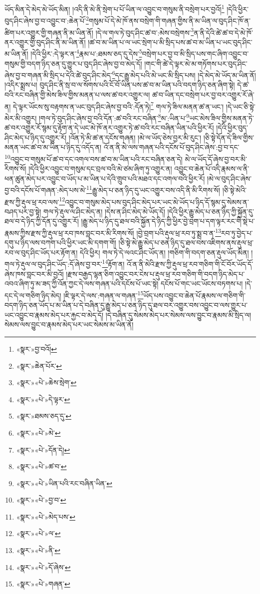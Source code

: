 ཡོད་མིན་དེ་མེད་མེ་ཡོད་མིན། །འདི་ནི་མེ་ནི་སྲེག་པ་པོ་ཡིན་ལ་འབྱུང་བ་གསུམ་ནི་བསྲེག་པར་བྱའོ།\footnote{«སྣར་»བྱ་བའོ།} །དེའི་ཕྱིར་བུད་ཤིང་ཞེས་བྱ་བ་འབྱུང་བ་:ཆེན་པོ་\footnote{«སྣར་»ཆེན་པོར་}གསུམ་པོ་དེ་མེ་ཁོ་ནས་བསྲེག་གི་གཞན་གྱིས་ནི་མ་ཡིན་ལ་བུད་ཤིང་ཁོ་ན་ཚིག་པར་འགྱུར་གྱི་གཞན་ནི་མ་ཡིན་ནོ། །དེ་ལ་གལ་ཏེ་བུད་ཤིང་ཚ་བ་:མེས་བསྲེགས་\footnote{«སྣར་»«པེ་»ཆེས་སྲེག་}ན་ནི་དེའི་ཚེ་ཚ་བ་དེ་མེ་ཁོ་ནར་འགྱུར་གྱི་བུད་ཤིང་ནི་མ་ཡིན་ནོ། །ཚ་བ་མ་ཡིན་པ་ལ་ཡང་སྲེག་པ་མི་སྲིད་པས་ཚ་བ་མ་ཡིན་པ་ཡང་བུད་ཤིང་མ་ཡིན་ནོ། །དེའི་ཕྱིར་:དེ་ལྟར་ན་\footnote{«སྣར་»«པེ་»དེ་ལྟར་}རྣམ་པ་:ཐམས་ཅད་དུ་དེས་\footnote{«སྣར་»ཐམས་ཅད་དུ་}བསྲེག་པར་བྱ་བ་མི་སྲིད་པས་གང་ཞིག་འབྱུང་བ་གསུམ་གྱི་བདག་ཉིད་ཅན་དུ་གྱུར་པ་བུད་ཤིང་ཞེས་བྱ་བ་མེད་དོ། །གང་གི་ཚེ་དེ་ལྟར་མེ་མ་གཏོགས་པར་བུད་ཤིང་ཞེས་བྱ་བ་གཞན་མི་སྲིད་པ་དེའི་ཚེ་བུད་ཤིང་མེད་\footnote{«སྣར་»«པེ་»མེ་}དང་རྒྱུ་མེད་པའི་མེ་ཡང་མི་སྲིད་པས། །དེ་མེད་མེ་ཡོད་མ་ཡིན་ནོ། །འདིར་སྨྲས་པ། བུད་ཤིང་ནི་སྲ་བ་ལ་སོགས་པའི་ངོ་བོ་ཡིན་པས་ཚ་བ་མ་ཡིན་པའི་བདག་ཉིད་ཅན་ཞིག་སྟེ། དེ་ཚ་བའི་རང་བཞིན་གྱི་མེས་ཟིལ་གྱིས་མནན་པ་ལས་ཚ་བར་འགྱུར་ལ། ཚ་བ་ཡིན་དང་བསྲེག་པར་བྱ་བར་འགྱུར་རོ་ཞེ་ན། དེ་ལྟར་ཡོངས་སུ་བརྟགས་ན་ཡང་བུད་ཤིང་ཞེས་བྱ་བའི་:དོན་ཏེ།\footnote{«སྣར་»«པེ་»དོན་དེ།} གལ་ཏེ་ཟིལ་མནན་ཚ་ན་ཡང་། །དེ་ཡང་ཅི་སྟེ་མེར་མི་འགྱུར། །གལ་ཏེ་བུད་ཤིང་ཞེས་བྱ་བའི་དོན་:ཚ་བའི་རང་བཞིན་\footnote{«སྣར་»«པེ་»ཚ་བ་}མ་:ཡིན་པ་\footnote{«སྣར་»«པེ་»ཡིན་པའི་རང་བཞིན་ཡིན་}ཡང་མེས་ཟིལ་གྱིས་མནན་ཏེ་ཚ་བར་འགྱུར་རོ་སྙམ་དུ་རྟོག་ན་དེ་ཡང་མེ་ཁོ་ནར་འགྱུར་ཏེ་ཚ་བའི་རང་བཞིན་ཡིན་པའི་ཕྱིར་རོ། །དེའི་ཕྱིར་བུད་ཤིང་མེད་པ་ཉིད་དུ་འགྱུར་རོ། །འོན་ཏེ་མི་ཚ་ན་དངོས་གཞན། །མེ་ལ་ཡོད་ཅེས་བྱར་མི་རུང་། །ཅི་སྟེ་དོན་དེ་ཟིལ་གྱིས་མནན་ཡང་ཚ་བ་མ་ཡིན་པ་ཉིད་དུ་འདོད་ན། འོ་ན་ནི་མེ་ལས་གཞན་པའི་དངོས་པོ་བུད་ཤིང་ཞེས་:བྱ་བ་དང་\footnote{«སྣར་»«པེ་»བྱ་བ་}འབྱུང་བ་གསུམ་པོ་ཚ་བ་དང་འགལ་བས་ཚ་བ་མ་ཡིན་པའི་རང་བཞིན་ཅན་དེ། མེ་ལ་ཡོད་དོ་ཞེས་བྱ་བར་མི་རིགས་སོ། །དེའི་ཕྱིར་འབྱུང་བ་གསུམ་དང་བྲལ་བའི་མེ་ཙམ་ཞིག་ཏུ་འགྱུར་ན། འབྱུང་བ་ཆེན་པོ་འདི་རྣམས་ལ་ནི་ཕན་ཚུན་མེད་པར་འབྱུང་བ་ཡོད་པ་མ་ཡིན་པ་དེའི་གྲུབ་པའི་མཐའ་དང་འགལ་བའི་ཕྱིར་རོ། །མེ་ལ་བུད་ཤིང་ཞེས་བྱ་བའི་དངོས་པོ་གཞན་:མེད་པས་མེ་\footnote{«སྣར་»«པེ་»མེད་པས་}རྒྱུ་མེད་པ་ཅན་ཉིད་དུ་ཡང་འགྱུར་བས་འདི་ནི་མི་རིགས་སོ། །ཅི་སྟེ་མེའི་རྫས་ཀྱི་རྡུལ་ཕྲ་རབ་ལས་\footnote{«སྣར་»«པེ་»ལ་}འབྱུང་བ་གསུམ་མེད་པས་བུད་ཤིང་མེད་པར་ཡང་མེ་ཡོད་པ་ཉིད་དོ་སྙམ་དུ་སེམས་ན་བཤད་པར་བྱ་སྟེ། གལ་ཏེ་རྡུལ་ལ་ཤིང་མེད་ན། །དེས་ན་ཤིང་མེད་མེ་ཡོད་དོ། །དེའི་ཕྱིར་རྒྱུ་མེད་པ་ཅན་ཉིད་ཀྱི་སྐྱོན་དུ་ཐལ་བ་དེ་ཉིད་ཀྱི་དོན་དུ་འགྱུར་རོ། །རྒྱུ་མེད་པ་ཉིད་དུ་ཐལ་བའི་སྐྱོན་དེ་ཉིད་ཀྱི་ཕྱིར་བྱེ་བྲག་པ་དག་ལྟར་རང་གི་སྡེ་པ་རྣམས་ཀྱིས་རྫས་ཀྱི་རྡུལ་ཕྲ་རབ་ཁས་བླང་བར་མི་རིགས་སོ། །བྱེ་བྲག་པའི་རྡུལ་ཕྲ་རབ་ཏུ་སྨྲ་བ་ན་\footnote{«སྣར་»«པེ་»ནི་}རབ་ཏུ་བྱེད་པ་དགུ་པ་ཉིད་ལས་བཀག་པའི་ཕྱིར་ཡང་མི་དགག་གོ། །ཅི་སྟེ་མེ་རྒྱུ་མེད་པ་ཅན་ཉིད་དུ་ཐལ་བས་འཇིགས་ནས་རྡུལ་ཕྲ་རབ་ལ་བུད་ཤིང་ཡོད་པར་རྟོག་ན། དེའི་ཕྱིར། གལ་ཏེ་དེ་ལའང་ཤིང་ཡོད་ན། །གཅིག་གི་བདག་ཅན་རྡུལ་ཡོད་མིན། །གལ་ཏེ་རྡུལ་ལ་བུད་ཤིང་ཡོད་:དོ་ཞེས་བྱ་བར་\footnote{«སྣར་»«པེ་»དོ་ཞེས་}རྟོག་ན། འོ་ན་ནི་མེའི་རྫས་ཀྱི་རྡུལ་ཕྲ་རབ་གཅིག་གི་ངོ་བོར་ཡོད་དོ་ཞེས་ཁས་བླང་བར་མི་བྱའོ། །རྫས་བརྒྱད་ལྷན་ཅིག་འབྱུང་བར་ངེས་པ་རྡུལ་ཕྲ་རབ་གཅིག་གི་བདག་ཉིད་མེད་པ་འབའ་ཞིག་ཏུ་མ་ཟད་ཀྱི་འོན་ཀྱང་དེ་ལས་གཞན་པའི་དངོས་པོ་ཡང་སྟེ། དངོས་པོ་གང་ཡང་ཡོངས་བཏགས་པ། །དེ་དང་དེ་ལ་གཅིག་ཉིད་མེད། །ཇི་ལྟར་དེ་ལས་:གཞན་ལ་གཞན་\footnote{«སྣར་»«པེ་»གཞན་}ཡོད་པས་འབྱུང་བ་ཆེན་པོ་རྣམས་ལ་གཅིག་གི་བདག་ཉིད་ཅན་ཡོད་པ་མ་ཡིན་པ་དེ་བཞིན་དུ་རྒྱུ་མེད་པ་ཅན་ཉིད་དུ་ཐལ་བར་འགྱུར་བས་འབྱུང་བ་ལས་གྱུར་པ་ཡང་འབྱུང་བ་རྣམས་མེད་པར་རྐྱང་བ་མེད་དོ། །དེ་བཞིན་དུ་སེམས་མེད་པར་སེམས་ལས་བྱུང་བ་རྣམས་མི་སྲིད་ལ། སེམས་ལས་བྱུང་བ་རྣམས་མེད་པར་ཡང་སེམས་མ་ཡིན་ནོ། 